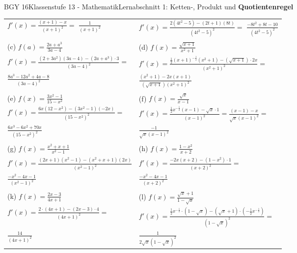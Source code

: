 \documentclass[oneside,openany,headings=optiontotoc,11pt,numbers=noenddot]{scrreprt}
\begin{document}
\begin{worksheet}{BGY 16}{Klassenstufe 13 - Mathematik}{Lernabschnitt 1: Ketten-, Produkt und \textbf{Quotientenregel}}
\begin{framed}
\begin{tabularx}{\textwidth}{XX}
				\(f'(x) = \frac{(x+1) - x}{(x+1)^2} =\) \colorbox{green!10}{\(\frac{1}{(x+1)^2}\)} & \(f'(x) = \frac{2(4t^2-5) - (2t+1)(8t)}{(4t^2-5)^2} =\) \colorbox{green!10}{\(\frac{-8t^2+8t-10}{(4t^2-5)^2}\)}\\
				\\
				(c) \(f(a) = \frac{2a + a^3}{3a-4}\) & (d) \(f(x) = \frac{\sqrt{x+1}}{x^2+1}\)\\
				\(f'(x) = \frac{(2+3a^2)(3a-4) - (2a+a^3)\cdot{}3}{(3a-4)^2} =\) & \(f'(x) = \frac{\frac{1}{2}(x+1)^{-\frac{1}{2}}(x^2+1) - (\sqrt{x+1})\cdot{}2x}{(x^2+1)^2} =\)\\
				\colorbox{green!10}{\(\frac{8a^3-12a^2 + 4a -8}{(3a-4)^2}\)} & \colorbox{green!10}{\(\frac{(x^2+1) - 2x(x+1)}{(\sqrt{x+1})(x^2+1)^2}\)}\\
				\\
				(e) \(f(x) = \frac{3x^2-1}{15-x^2}\) & (f) \(f(x) = \frac{\sqrt{x}}{x-1}\)\\
				\(f'(x) = \frac{6x(12-x^2) - (3x^2-1)(-2x)}{(15-x^2)^2} =\) & \(f'(x) = \frac{\frac{1}{2}x^{-\frac{1}{2}}(x-1) - \sqrt{x}\cdot{}1}{(x-1)^2} = \frac{(x-1)-x}{\sqrt{x}(x-1)^2} =\)\\
				\colorbox{green!10}{\(\frac{6x^3-6x^2+70x}{(15-x^2)^2}\)} & \colorbox{green!10}{\(\frac{-1}{\sqrt{x}(x-1)^2}\)}\\
				\\
				(g) \(f(x) = \frac{x^2+x+1}{x^2-1}\) & (h) \(f(x) = \frac{1-x^2}{x+2}\)\\
				\(f'(x) = \frac{(2x+1)(x^2-1) - (x^2+x+1)(2x)}{(x^2-1)^2}\) & \(f'(x) = \frac{-2x(x+2) - (1-x^2)\cdot{}1}{(x+2)^2} =\)\\
				\colorbox{green!10}{\(\frac{-x^2-4x-1}{(x^2-1)^2}\)} & \colorbox{green!10}{\(\frac{-x^2-4x-1}{(x+2)^2}\)}\\
				\\
				(k) \(f(x) = \frac{2x-3}{4x+1}\) & (l) \(f(x) = \frac{\sqrt{x}+1}{1-\sqrt{x}}\)\\
				\(f'(x) = \frac{2\cdot(4x+1) - (2x-3)\cdot{}4}{(4x+1)^2} =\) & \(f'(x) = \frac{\frac{1}{2}x^{-\frac{1}{2}}\cdot(1-\sqrt{x}) - (\sqrt{x}+1)\cdot(-\frac{1}{2}x^{-\frac{1}{2}})}{(1-\sqrt{x})^2} =\)\\
				\colorbox{green!10}{\(\frac{14}{(4x+1)^2}\)} & \colorbox{green!10}{\(\frac{1}{2\sqrt{x}(1-\sqrt{x})^2}\)}
			\end{tabularx}\\
		\end{framed}
	\end{worksheet}
\end{document}
